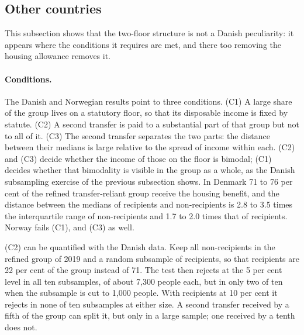 \subsection{Other countries}\label{sec:countries}

This subsection shows that the two-floor structure is not a Danish peculiarity: it appears where the conditions it requires are met, and there too removing the housing allowance removes it.

\paragraph{Conditions.} The Danish and Norwegian results point to three conditions. (C1) A large share of the group lives on a statutory floor, so that its disposable income is fixed by statute. (C2) A second transfer is paid to a substantial part of that group but not to all of it. (C3) The second transfer separates the two parts: the distance between their medians is large relative to the spread of income within each. (C2) and (C3) decide whether the income of those on the floor is bimodal; (C1) decides whether that bimodality is visible in the group as a whole, as the Danish subsampling exercise of the previous subsection shows. In Denmark 71 to 76 per cent of the refined transfer-reliant group receive the housing benefit, and the distance between the medians of recipients and non-recipients is 2.8 to 3.5 times the interquartile range of non-recipients and 1.7 to 2.0 times that of recipients. Norway fails (C1), and (C3) as well.

(C2) can be quantified with the Danish data. Keep all non-recipients in the refined group of 2019 and a random subsample of recipients, so that recipients are 22 per cent of the group instead of 71. The test then rejects at the 5 per cent level in all ten subsamples, of about 7{,}300 people each, but in only two of ten when the subsample is cut to 1{,}000 people. With recipients at 10 per cent it rejects in none of ten subsamples at either size. A second transfer received by a fifth of the group can split it, but only in a large sample; one received by a tenth does not.


